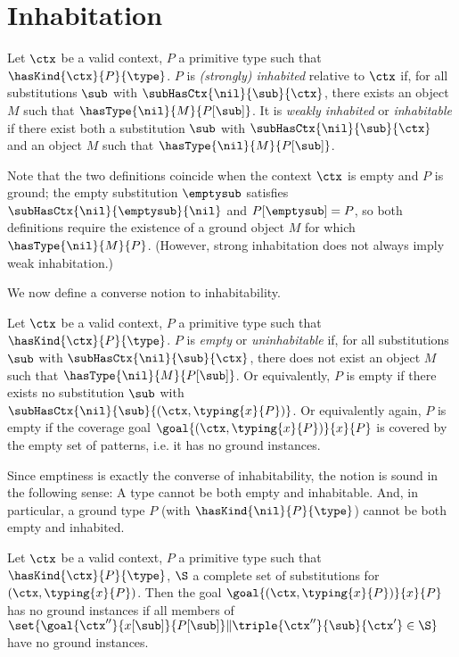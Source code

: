 \clearpage

\section*{Inhabitation}

\begin{definition}[Inhabitation]
\label{def:inhabitation}
Let $\ctx$ be a valid context, $P$ a primitive type such that $\hasKind{\ctx}{P}{\type}$.
$P$ is \emph{(strongly) inhabited} relative to $\ctx$ if, for all substitutions $\sub$ with $\subHasCtx{\nil}{\sub}{\ctx}$, there exists an object $M$ such that $\hasType{\nil}{M}{P[\sub]}$.
It is \emph{weakly inhabited} or \emph{inhabitable} if there exist both a substitution $\sub$ with $\subHasCtx{\nil}{\sub}{\ctx}$ and an object $M$ such that $\hasType{\nil}{M}{P[\sub]}$.
\end{definition}

Note that the two definitions coincide when the context $\ctx$ is empty and $P$ is ground; the empty substitution $\emptysub$ satisfies $\subHasCtx{\nil}{\emptysub}{\nil}$ and $P[\emptysub] = P$, so both definitions require the existence of a ground object $M$ for which $\hasType{\nil}{M}{P}$.
(However, strong inhabitation does not always imply weak inhabitation.)

We now define a converse notion to inhabitability.

\begin{definition}[Emptiness]
\label{def:emptiness}
Let $\ctx$ be a valid context, $P$ a primitive type such that $\hasKind{\ctx}{P}{\type}$.
$P$ is \emph{empty} or \emph{uninhabitable} if, for all substitutions $\sub$ with $\subHasCtx{\nil}{\sub}{\ctx}$, there does not exist an object $M$ such that $\hasType{\nil}{M}{P[\sub]}$.
Or equivalently, $P$ is empty if there exists no substitution $\sub$ with $\subHasCtx{\nil}{\sub}{(\ctx, \typing{x}{P})}$.
Or equivalently again, $P$ is empty if the coverage goal $\goal{(\ctx, \typing{x}{P})}{x}{P}$ is covered by the empty set of patterns, i.e. it has no ground instances.
\end{definition}

Since emptiness is exactly the converse of inhabitability, the notion is sound in the following sense:
A type cannot be both empty and inhabitable.
And, in particular, a ground type $P$ (with $\hasKind{\nil}{P}{\type}$) cannot be both empty and inhabited.

\begin{theorem}
\label{thm:conservativity-emptiness}
Let $\ctx$ be a valid context, $P$ a primitive type such that $\hasKind{\ctx}{P}{\type}$, $\S$ a complete set of substitutions for $(\ctx, \typing{x}{P})$.
Then the goal $\goal{(\ctx, \typing{x}{P})}{x}{P}$ has no ground instances if all members of $\set{\goal{\ctx''}{x[\sub]}{P[\sub]} \| \triple{\ctx''}{\sub}{\ctx'} \in \S}$ have no ground instances.
\end{theorem}

